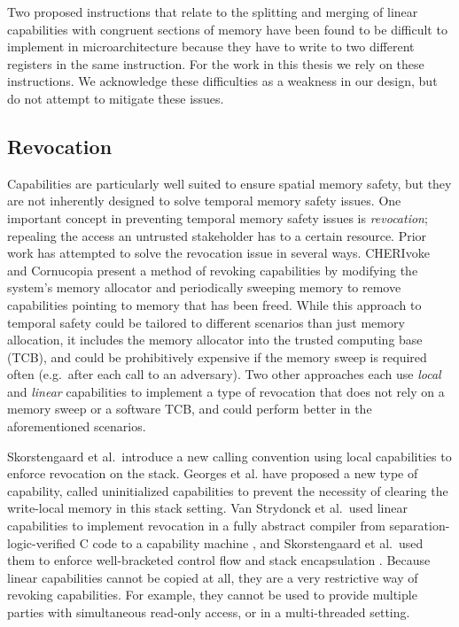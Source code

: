 Two proposed instructions that relate to the splitting and merging of linear capabilities with congruent sections of memory have been found to be difficult to implement in microarchitecture because they have to write to two different registers in the same instruction. For the work in this thesis we rely on these instructions. We acknowledge these difficulties as a weakness in our design, but do not attempt to mitigate these issues.

\subsection{Revocation}
Capabilities are particularly well suited to ensure spatial memory safety, but they are not inherently designed to solve temporal memory safety issues.
One important concept in preventing temporal memory safety issues is \textit{revocation}; repealing the access an untrusted stakeholder has to a certain resource.
Prior work has attempted to solve the revocation issue in several ways.
CHERIvoke \cite{xia_cherivoke_2019} and Cornucopia \cite{nathaniel_wesley_filardo_cornucopia_2020} present a method of revoking capabilities by modifying the system's memory allocator and periodically sweeping memory to remove capabilities pointing to memory that has been freed.
While this approach to temporal safety could be tailored to different scenarios than just memory allocation, it includes the memory allocator into the trusted computing base (TCB), and could be prohibitively expensive if the memory sweep is required often (e.g.\ after each call to an adversary).
Two other approaches each use \textit{local} and \textit{linear} capabilities to implement a type of revocation that does not rely on a memory sweep or a software TCB, and could perform better in the aforementioned scenarios.

Skorstengaard et al.\ introduce a new calling convention using local capabilities \cite{skorstengaard:esop18} to enforce revocation on the stack.
Georges et al. have proposed a new type of capability, called uninitialized capabilities \cite{georges_efficient_2021} to prevent the necessity of clearing the write-local memory in this stack setting.
Van Strydonck et al.\ used linear capabilities to implement revocation in a fully abstract compiler from separation-logic-verified C code to a capability machine \cite{van_strydonck_linear_2019}, and Skorstengaard et al.\ used them to enforce well-bracketed control flow and stack encapsulation \cite{skorstengaard:popl19}.
Because linear capabilities cannot be copied at all, they are a very restrictive way of revoking capabilities.
For example, they cannot be used to provide multiple parties with simultaneous read-only access, or in a multi-threaded setting.

